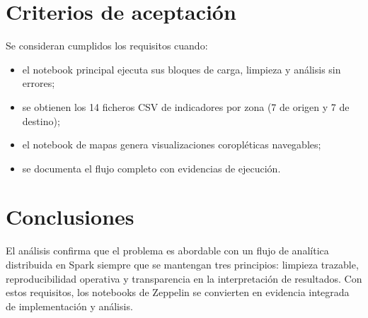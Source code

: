 \section{Criterios de aceptación}
Se consideran cumplidos los requisitos cuando:
\begin{itemize}
	\item el notebook principal ejecuta sus bloques de carga, limpieza y análisis
	sin errores;
	\item se obtienen los 14 ficheros CSV de indicadores por zona (7 de origen y
	7 de destino);
	\item el notebook de mapas genera visualizaciones coropléticas navegables;
	\item se documenta el flujo completo con evidencias de ejecución.
\end{itemize}

\section{Conclusiones}
El análisis confirma que el problema es abordable con un flujo de analítica
distribuida en Spark siempre que se mantengan tres principios: limpieza trazable,
reproducibilidad operativa y transparencia en la interpretación de resultados.
Con estos requisitos, los notebooks de Zeppelin se convierten en evidencia
integrada de implementación y análisis.